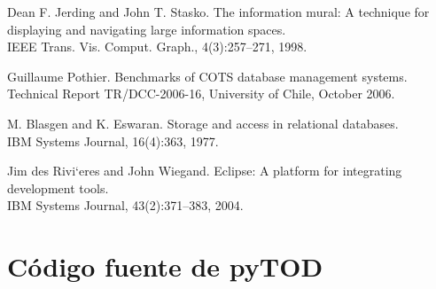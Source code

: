 \documentclass[12pt,legalpaper]{report}
\begin{document}
\begin{thebibliography}{30}
 Dean F. Jerding and John T. Stasko. The information mural: A technique for displaying and navigating large information spaces.\\
IEEE Trans. Vis. Comput. Graph., 4(3):257–271, 1998.

 Guillaume Pothier. Benchmarks of COTS database management systems. \\
Technical Report TR/DCC-2006-16, University of Chile, October 2006.

M. Blasgen and K. Eswaran. Storage and access in relational databases. \\
IBM Systems Journal, 16(4):363, 1977.

 Jim des Rivi`eres and John Wiegand. Eclipse: A platform for integrating development tools.\\
IBM Systems Journal, 43(2):371–383, 2004.

\end{thebibliography}

\appendix
\appendixpage
\addappheadtotoc
\pagebreak
\chapter{Código fuente de pyTOD}
\end{document}
